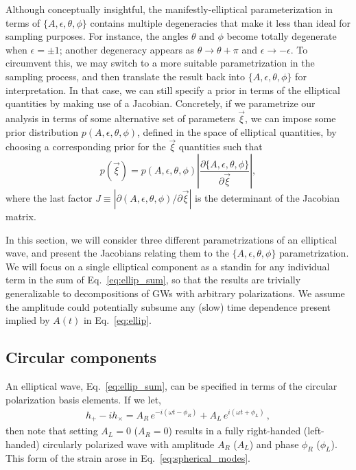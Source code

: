 \documentclass[aps,prd,twocolumn,superscriptaddress,preprintnumbers,floatfix,nofootinbib]{revtex4-2}
\begin{document}
Although conceptually insightful, the manifestly-elliptical parameterization in terms of $\{A, \epsilon, \theta, \phi\}$ contains multiple degeneracies that make it less than ideal for sampling purposes.
For instance, the angles $\theta$ and $\phi$ become totally degenerate when $\epsilon = \pm 1$; another degeneracy appears as $\theta \to \theta + \pi$ and $\epsilon \to - \epsilon$.
To circumvent this, we may switch to a more suitable parametrization in the sampling process, and then translate the result back into $\{A, \epsilon, \theta, \phi\}$ for interpretation.
In that case, we can still specify a prior in terms of the elliptical quantities by making use of a Jacobian.
Concretely, if we parametrize our analysis in terms of some alternative set of parameters $\vec{\xi}$, we can impose some prior distribution $p({A, \epsilon, \theta, \phi})$, defined in the space of elliptical quantities, by choosing a corresponding prior for the $\vec{\xi}$ quantities such that
\begin{equation}
p \left( \vec{\xi} \right) = p \left( A, \epsilon, \theta, \phi \right) \left| \frac{\partial \{A, \epsilon, \theta, \phi\}}{\partial \vec{\xi}} \right| ,
\end{equation}
where the last factor $J \equiv | \partial (A, \epsilon, \theta, \phi)/\partial \vec{\xi} |$ is the determinant of the Jacobian matrix.


In this section, we will consider three different parametrizations of an elliptical wave, and present the Jacobians relating them to the $\{A, \epsilon, \theta, \phi\}$ parametrization.
We will focus on a single elliptical component as a standin for any individual term in the sum of Eq.~\eqref{eq:ellip_sum}, so that the results are trivially generalizable to decompositions of GWs with arbitrary polarizations.
We assume the amplitude could potentially subsume any (slow) time dependence present implied by $A(t)$ in Eq.~\eqref{eq:ellip}.


\subsection{Circular components}

An elliptical wave, Eq.~\eqref{eq:ellip_sum}, can be specified in terms of the circular polarization basis elements.
If we let,
\begin{align} \label{eq:Cphi}
h_+ - i h_\times = A_{R}\, e^{-i \left(\omega t - \phi_R \right) } + A_{L}\, e^{i \left(\omega t + \phi_L \right) }\, ,
\end{align}
then note that setting $A_L = 0$ ($A_R =0$) results in a fully right-handed (left-handed) circularly polarized wave with amplitude $A_R$ ($A_L$) and phase $\phi_R$ ($\phi_L$).
This form of the strain arose in Eq.~\eqref{eq:spherical_modes}.
\end{document}
